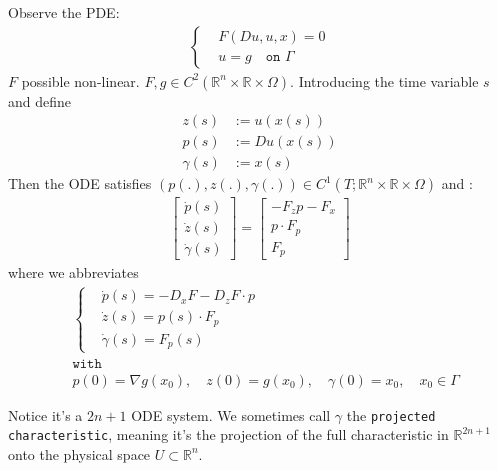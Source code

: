 \begin{definition}
Observe the PDE:
\begin{align*}
	\left\{
	\begin{aligned}
		&F(Du, u, x) = 0\\
		&u = g \quad \texttt{on } \Gamma
	\end{aligned}
	\right.
\end{align*}
$F$ possible non-linear. $F, g \in C^2(\mathbb{R}^n \times \mathbb{R} \times \Omega)$. Introducing the time variable $s$ and define
	\begin{align*}
		z(s) &:= u(x(s))\\
		p(s) &:= Du(x(s))\\
		\gamma(s) &:= x(s)
	\end{align*}
Then the ODE satisfies $ (p(.), z(.), \gamma(.)) \in C^1(T; \mathbb{R}^n \times \mathbb{R} \times \Omega)$ and :
	\begin{align*}
		\begin{bmatrix}
			\dot{p}(s)\\
			\dot{z}(s)\\
			\dot{\gamma}(s)
		\end{bmatrix}
	= 
		\begin{bmatrix}
			- F_z p - F_x \\
			p \cdot F_p\\
			F_p
		\end{bmatrix}
	\end{align*}
	where we abbreviates 
	\begin{align*}
		&\left\{
	\begin{aligned}
		&\dot{p}(s) =-D_x F - D_z F \cdot p \\
		&\dot{z}(s) = p(s) \cdot F_p\\
		&\dot{\gamma}(s) = F_p(s)
	\end{aligned}
	\right.\\
	&\texttt{with}\\
	&p(0) = \nabla g(x_0), \quad z(0) = g(x_0), \quad \gamma(0) = x_0, \quad x_0 \in \Gamma
	\end{align*}
\end{definition}
\begin{remark}
Notice it's a $2n + 1$ ODE system. We sometimes call $\gamma$ the \texttt{projected characteristic}, meaning it's the projection of the full characteristic in $\mathbb{R}^{2n + 1}$ onto the physical space  $U \subset \mathbb{R}^n$.
\end{remark}

